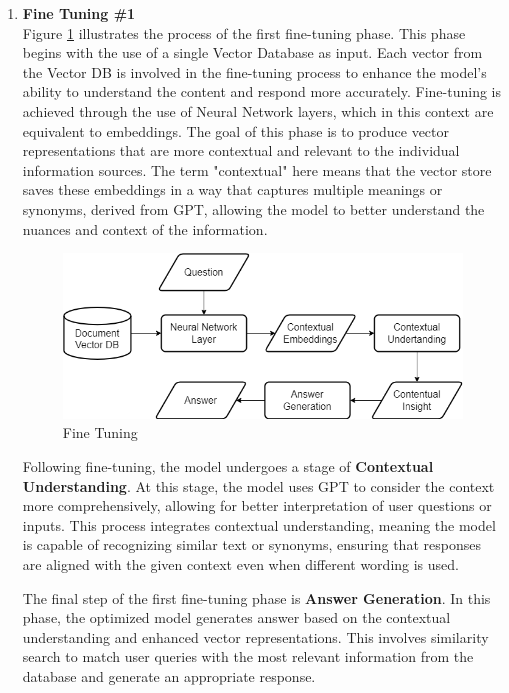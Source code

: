 \documentclass[runningheads]{llncs}
\begin{document}
\begin{enumerate}
    \item \textbf{Fine Tuning \#1} \\
        Figure \ref{fig:fine-tuning-1} illustrates the process of the first fine-tuning phase. This phase begins with the use of a single Vector Database as input. Each vector from the Vector DB is involved in the fine-tuning process to enhance the model's ability to understand the content and respond more accurately. Fine-tuning is achieved through the use of Neural Network layers, which in this context are equivalent to embeddings. The goal of this phase is to produce vector representations that are more contextual and relevant to the individual information sources. The term "contextual" here means that the vector store saves these embeddings in a way that captures multiple meanings or synonyms, derived from GPT, allowing the model to better understand the nuances and context of the information.

        \begin{figure}[htbp]
            \centerline{\includegraphics[scale=0.4]{eng-fine1.png}}
            \caption{Fine Tuning}
            \label{fig:fine-tuning-1}
        \end{figure}

        Following fine-tuning, the model undergoes a stage of \textbf{Contextual Understanding}.  At this stage, the model uses GPT to consider the context more comprehensively, allowing for better interpretation of user questions or inputs. This process integrates contextual understanding, meaning the model is capable of recognizing similar text or synonyms, ensuring that responses are aligned with the given context even when different wording is used.

        The final step of the first fine-tuning phase is \textbf{Answer Generation}. In this phase, the optimized model generates answer based on the contextual understanding and enhanced vector representations. This involves similarity search to match user queries with the most relevant information from the database and generate an appropriate response.
                    

\end{enumerate}
\end{document}
